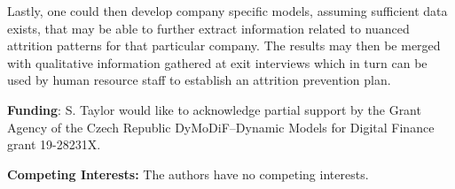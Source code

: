 \documentclass[10pt]{article}
\begin{document}
Lastly, one could then develop company specific models, 
assuming sufficient data exists, that may be able to further extract information 
related to nuanced attrition patterns for that particular company.  The results 
may then be merged with qualitative information gathered at exit interviews which  
in turn can be used by human resource staff to establish an attrition prevention plan. 


\textbf{Funding}: S. Taylor would like to acknowledge partial support by the 
Grant Agency of the Czech Republic DyMoDiF--Dynamic Models for Digital Finance 
grant 19-28231X. 

\textbf{Competing Interests:} The authors have no competing interests.




\end{document}
